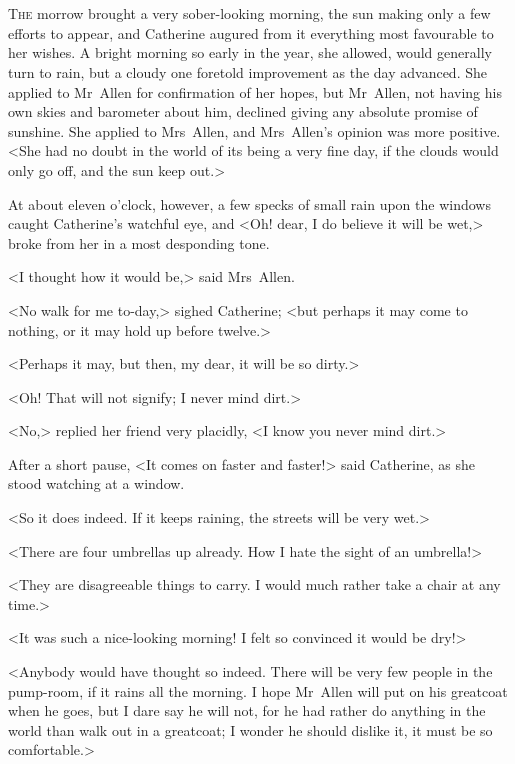 \chapter[Chapter \thechapter]{} 

 \lettrine{T}{he} morrow brought a very sober-looking morning, the sun making only a few efforts to appear, and Catherine augured from it everything most favourable to her wishes. A bright morning so early in the year, she allowed, would generally turn to rain, but a cloudy one foretold improvement as the day advanced. She applied to Mr~Allen for confirmation of her hopes, but Mr~Allen, not having his own skies and barometer about him, declined giving any absolute promise of sunshine. She applied to Mrs~Allen, and Mrs~Allen's opinion was more positive. <She had no doubt in the world of its being a very fine day, if the clouds would only go off, and the sun keep out.> 

 At about eleven o'clock, however, a few specks of small rain upon the windows caught Catherine's watchful eye, and <Oh! dear, I do believe it will be wet,> broke from her in a most desponding tone. 

 <I thought how it would be,> said Mrs~Allen. 

 <No walk for me to-day,> sighed Catherine; <but perhaps it may come to nothing, or it may hold up before twelve.> 

 <Perhaps it may, but then, my dear, it will be so dirty.> 

 <Oh! That will not signify; I never mind dirt.> 

 <No,> replied her friend very placidly, <I know you never mind dirt.> 

 After a short pause, <It comes on faster and faster!> said Catherine, as she stood watching at a window. 

 <So it does indeed. If it keeps raining, the streets will be very wet.> 

 <There are four umbrellas up already. How I hate the sight of an umbrella!> 

 <They are disagreeable things to carry. I would much rather take a chair at any time.> 

 <It was such a nice-looking morning! I felt so convinced it would be dry!> 

 <Anybody would have thought so indeed. There will be very few people in the pump-room, if it rains all the morning. I hope Mr~Allen will put on his greatcoat when he goes, but I dare say he will not, for he had rather do anything in the world than walk out in a greatcoat; I wonder he should dislike it, it must be so comfortable.> 

